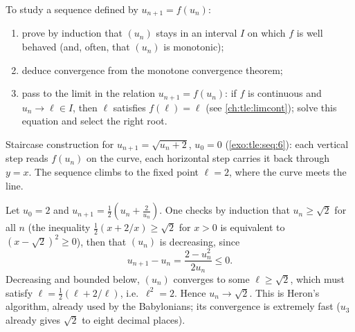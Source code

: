 \begin{method}[Recurrent sequences $u_{n+1} = f(u_n)$]\label{met:tle:seq:recurrent}
To study a sequence defined by $u_{n+1} = f(u_n)$:
\begin{enumerate}
  \item prove by induction that $(u_n)$ stays in an interval $I$ on which $f$
        is well behaved (and, often, that $(u_n)$ is monotonic);
  \item deduce convergence from the monotone convergence theorem;
  \item pass to the limit in the relation $u_{n+1} = f(u_n)$: if $f$ is
        continuous and $u_n \to \ell \in I$, then $\ell$ satisfies
        $f(\ell) = \ell$ (see \cref{ch:tle:limcont}); solve this equation and
        select the right root.
\end{enumerate}
\end{method}

\begin{omfigure}

{\small Staircase construction for $u_{n+1} = \sqrt{u_n + 2}$, $u_0 = 0$
(\cref{exo:tle:seq:6}): each vertical step reads $f(u_n)$ on the curve,
each horizontal step carries it back through $y = x$. The sequence climbs
to the fixed point $\ell = 2$, where the curve meets the line.}
\end{omfigure}

\begin{example}\label{ex:tle:seq:sqrt2}
Let $u_0 = 2$ and $u_{n+1} = \frac{1}{2}\left(u_n + \frac{2}{u_n}\right)$.
One checks by induction that $u_n \geq \sqrt{2}$ for all $n$ (the inequality
$\frac{1}{2}(x + 2/x) \geq \sqrt{2}$ for $x>0$ is equivalent to
$(x - \sqrt2)^2 \geq 0$), then that $(u_n)$ is decreasing, since
\[
u_{n+1}-u_n=\frac{2-u_n^2}{2u_n}\leq 0 .
\]
Decreasing and bounded below, $(u_n)$
converges to some $\ell \geq \sqrt{2}$, which must satisfy
$\ell = \frac{1}{2}(\ell + 2/\ell)$, i.e.\ $\ell^2 = 2$. Hence
$u_n \to \sqrt{2}$. This is Heron's algorithm, already used by the
Babylonians; its convergence is extremely fast ($u_3$ already gives $\sqrt 2$
to eight decimal places).
\end{example}

